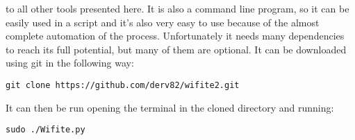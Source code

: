 to all other tools presented here. It is also a command line program, so it
can be easily used in a script and it's also very easy to use because of the
almost complete automation of the process. Unfortunately it needs many dependencies
to reach its full potential, but many of them are optional.
It can be downloaded using git in the following way:
\begin{lstlisting}[numbers=none]
    git clone https://github.com/derv82/wifite2.git
\end{lstlisting}
It can then be run opening the terminal in the cloned directory and running:
\begin{lstlisting}[numbers=none]
    sudo ./Wifite.py
\end{lstlisting}
\newpage